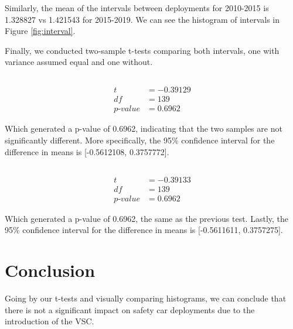 \documentclass[11pt]{article}
\begin{document}
Similarly, the mean of the intervals between deployments for 2010-2015 is 1.328827 vs 1.421543 for 2015-2019.
We can see the histogram of intervals in Figure \ref{fig:interval}.

\pagebreak

Finally, we conducted two-sample t-tests comparing both intervals, one with variance assumed equal and one without.

\subsection*{}
\begin{align*}
    t              & = -0.39129 \\
    df             & = 139      \\
    p\text{-}value & = 0.6962
\end{align*}

Which generated a p-value of 0.6962, indicating that the two samples are not significantly different.
More specifically, the 95\% confidence interval for the difference in means is [-0.5612108, 0.3757772].

\subsection*{}
\begin{align*}
    t              & = -0.39133 \\
    df             & = 139      \\
    p\text{-}value & = 0.6962
\end{align*}

Which generated a p-value of 0.6962, the same as the previous test.
Lastly, the 95\% confidence interval for the difference in means is [-0.5611611, 0.3757275].

\section*{Conclusion}
Going by our t-tests and visually comparing histograms, we can conclude that there is not a significant impact on safety car deployments due to the introduction of the VSC.
\end{document}
